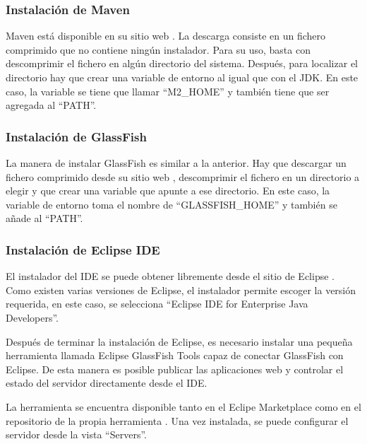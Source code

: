 \subsubsection{Instalación de Maven} \label{sec:maven}
Maven está disponible en su sitio web \cite{webpage:maven}. La descarga consiste
en un fichero comprimido que no contiene ningún instalador. Para su uso, basta
con descomprimir el fichero en algún directorio del sistema. Después, para
localizar el directorio hay que crear una variable de entorno al igual que con
el JDK. En este caso, la variable se tiene que llamar ``M2\_HOME'' y también
tiene que ser agregada al ``PATH''.

\subsubsection{Instalación de GlassFish} \label{sec:glassfish}
La manera de instalar GlassFish es similar a la anterior. Hay que descargar un
fichero comprimido desde su sitio web \cite{webpage:glassfish}, descomprimir
el fichero en un directorio a elegir y que crear una variable que apunte a ese
directorio. En este caso, la variable de entorno toma el nombre de 
``GLASSFISH\_HOME'' y también se añade al ``PATH''.

\subsubsection{Instalación de Eclipse IDE} \label{sec:eclipse}
El instalador del IDE se puede obtener libremente desde el sitio de Eclipse
\cite{webpage:eclipse}. Como existen varias versiones de Eclipse, el instalador
permite escoger la versión requerida, en este caso, se selecciona ``Eclipse IDE
for Enterprise Java Developers''.


Después de terminar la instalación de Eclipse, es necesario instalar
una pequeña herramienta llamada Eclipse GlassFish Tools capaz de conectar
GlassFish con Eclipse. De esta manera es posible publicar las aplicaciones web y
controlar el estado del servidor directamente desde el IDE.

La herramienta se encuentra disponible tanto en el Eclipe Marketplace como
en el repositorio de la propia herramienta \cite{webpage:glassfish-tools}. Una
vez instalada, se puede configurar el servidor desde la vista ``Servers''.


